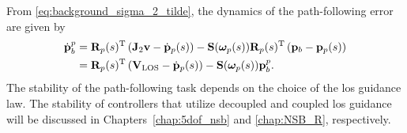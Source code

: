From \eqref{eq:background_sigma_2_tilde}, the dynamics of the path-following error are given by
\begin{equation}
    \begin{split}
        \dot{\mathbf{p}}_b^p &= \mathbf{R}_p(s)^{\mathrm{T}} \left(\mathbf{J}_2 \mathbf{v} - \dot{\mathbf{p}}_p(s)\right) - \mathbf{S}(\bm{\omega}_p(s))\mathbf{R}_p(s)^{\mathrm{T}}\left(\mathbf{p}_b - \mathbf{p}_p(s)\right) \\
        &= \mathbf{R}_p(s)^{\mathrm{T}} \left(\mathbf{V}_{\rm LOS} - \dot{\mathbf{p}}_p(s)\right) - \mathbf{S}(\bm{\omega}_p(s))\mathbf{p}_b^p.
    \end{split}
\end{equation}
The stability of the path-following task depends on the choice of the \gls{los} guidance law.
The stability of controllers that utilize decoupled and coupled \gls{los} guidance will be discussed in Chapters~\ref{chap:5dof_nsb} and \ref{chap:NSB_R}, respectively.
